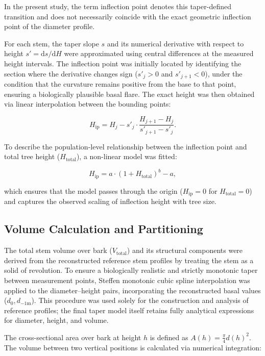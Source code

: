 \documentclass[twocolumn, bibliography=totoc]{scrartcl}
\begin{document}
In the present study, the term inflection point denotes this taper-defined transition and does not necessarily coincide with the exact geometric inflection point of the diameter profile.

For each stem, the taper slope $s$ and its numerical derivative with respect to height $s' = \mathrm{d}s/\mathrm{d}H$ were approximated using central differences at the measured height intervals. The inflection point was initially located by identifying the section where the derivative changes sign ($s'_j > 0$ and $s'_{j+1} < 0$), under the condition that the curvature remains positive from the base to that point, ensuring a biologically plausible basal flare. The exact height was then obtained via linear interpolation between the bounding points:

\begin{equation}
H_{\text{ip}} = H_j - s'_j \cdot \frac{H_{j+1} - H_j}{s'_{j+1} - s'_j}.
\end{equation}

To describe the population-level relationship between the inflection point and total tree height ($H_{\text{total}}$), a non-linear model was fitted:

\begin{equation}
H_{\text{ip}} = a \cdot (1 + H_{\text{total}})^b - a,
\end{equation}

which ensures that the model passes through the origin ($H_{\text{ip}} = 0$ for $H_{\text{total}} = 0$) and captures the observed scaling of inflection height with tree size.


\subsection{Volume Calculation and Partitioning}

The total stem volume over bark ($V_{\text{total}}$) and its structural components were derived from the reconstructed reference stem profiles by treating the stem as a solid of revolution. To ensure a biologically realistic and strictly monotonic taper between measurement points, Steffen monotonic cubic spline interpolation was applied to the diameter--height pairs, incorporating the reconstructed basal values ($d_0, d_{-1\text{m}}$). This procedure was used solely for the construction and analysis of reference profiles; the final taper model itself retains fully analytical expressions for diameter, height, and volume.

The cross-sectional area over bark at height $h$ is defined as $A(h) = \frac{\pi}{4} d(h)^2$. The volume between two vertical positions is calculated via numerical integration:
\end{document}
